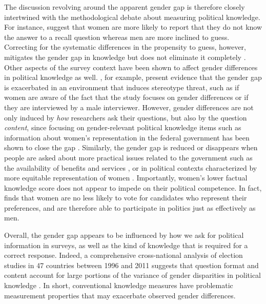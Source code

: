 The discussion revolving around the apparent gender gap is therefore closely intertwined with the methodological debate about measuring political knowledge. For instance, \citet{mondak2004knowledge} suggest that women are more likely to report that they do not know the answer to a recall question whereas men are more inclined to guess. Correcting for the systematic differences in the propensity to guess, however, mitigates the gender gap in knowledge but does not eliminate it completely \citep[see also][]{lizotte2009explaining,ferrin2017gender}. Other aspects of the survey context have been shown to affect gender differences in political knowledge as well. \citet{mcglone2006stereotype}, for example, present evidence that the gender gap is exacerbated in an environment that induces stereotype threat, such as if women are aware of the fact that the study focuses on gender differences or if they are interviewed by a male interviewer. However, gender differences are not only induced by \textit{how} researchers ask their questions, but also by the question \textit{content}, since focusing on gender-relevant political knowledge items such as information about women's representation in the federal government has been shown to close the gap \citep{graber2001processing,dolan2011women,fraile2014does,jerit2017revisiting}. Similarly, the gender gap is reduced or disappears when people are asked about more practical issues related to the government such as the availability of benefits and services \citep{stolle2010women}, or in political contexts characterized by more equitable representation of women \citep{pereira2019gendered,mcallister2019gender,wolak2019descriptive}. Importantly, women's lower factual knowledge score does not appear to impede on their political competence. In fact, \citet{dassonneville2020women} finds that women are no less likely to vote for candidates who represent their preferences, and are therefore able to participate in politics just as effectively as men.

Overall, the gender gap appears to be influenced by how we ask for political information in surveys, as well as the kind of knowledge that is required for a correct response. Indeed, a comprehensive cross-national analysis of election studies in 47 countries between 1996 and 2011 suggests that question format and content account for large portions of the variance of gender disparities in political knowledge \citep{fortin2016cross,fortin2020political}. In short, conventional knowledge measures have problematic measurement properties that may exacerbate observed gender differences. 


